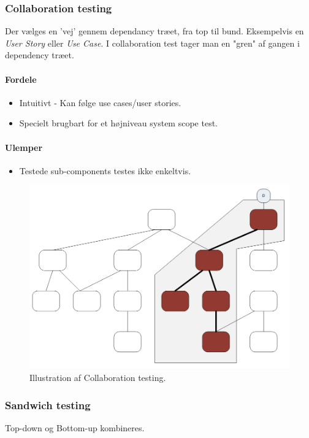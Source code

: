 \subsubsection{Collaboration testing}
Der vælges en 'vej' gennem dependancy træet, fra top til bund. Eksempelvis en \textit{User Story} eller \textit{Use Case}. I collaboration test tager man en "gren" af gangen i dependency træet.

\paragraph{Fordele}

\begin{itemize}
	\item Intuitivt - Kan følge use cases/user stories.
	\item Specielt brugbart for et højniveau system scope test.
\end{itemize}

\paragraph{Ulemper}

\begin{itemize}
	\item Testede sub-components testes ikke enkeltvis.
\end{itemize}

\begin{figure}[H]
	\centering
	\includegraphics[width=0.5\linewidth]{figs/collaborationTesting.PNG}
	\caption{Illustration af Collaboration testing.}
	\label{fig:collaborationTesting}
\end{figure}


\subsubsection{Sandwich testing}
Top-down og Bottom-up kombineres.


